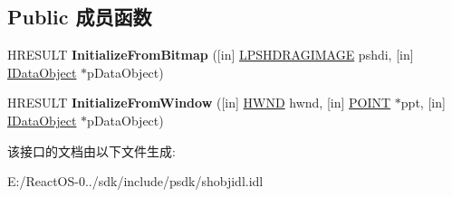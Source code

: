 \subsection*{Public 成员函数}
\begin{DoxyCompactItemize}
\item 
\mbox{\label{interface_i_drag_source_helper_a80fd2d4df3396e35eef0cda10c393110}} 
H\+R\+E\+S\+U\+LT {\bfseries Initialize\+From\+Bitmap} (\mbox{[}in\mbox{]} \hyperlink{struct_i_drag_source_helper_1_1_s_h_d_r_a_g_i_m_a_g_e}{L\+P\+S\+H\+D\+R\+A\+G\+I\+M\+A\+GE} pshdi, \mbox{[}in\mbox{]} \hyperlink{interface_i_data_object}{I\+Data\+Object} $\ast$p\+Data\+Object)
\item 
\mbox{\label{interface_i_drag_source_helper_a96383d6807b5c02a03b5b47768b796fc}} 
H\+R\+E\+S\+U\+LT {\bfseries Initialize\+From\+Window} (\mbox{[}in\mbox{]} \hyperlink{interfacevoid}{H\+W\+ND} hwnd, \mbox{[}in\mbox{]} \hyperlink{structtag_p_o_i_n_t}{P\+O\+I\+NT} $\ast$ppt, \mbox{[}in\mbox{]} \hyperlink{interface_i_data_object}{I\+Data\+Object} $\ast$p\+Data\+Object)
\end{DoxyCompactItemize}


该接口的文档由以下文件生成\+:\begin{DoxyCompactItemize}
\item 
E\+:/\+React\+O\+S-\/0../sdk/include/psdk/shobjidl.\+idl\end{DoxyCompactItemize}
